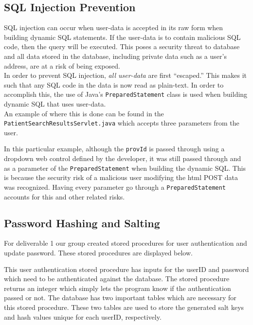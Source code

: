 \documentclass{article}
\begin{document}
\subsection{SQL Injection Prevention}
SQL injection can occur when user-data is accepted in its raw form when building dynamic SQL statements. If the user-data is to contain malicious SQL code, then the query will be executed. This poses a security threat to database and all data stored in the database, including private data such as a user's address, are at a risk of being exposed. \\

In order to prevent SQL injection, \textit{all user-data} are first ``escaped.'' This makes it such that any SQL code in the data is now read as plain-text. In order to accomplish this, the use of Java's \texttt{PreparedStatement} class is used when building dynamic SQL that uses user-data. \\

An example of where this is done can be found in the \texttt{PatientSearchResultsServlet.java} which accepts three parameters from the user.



In this particular example, although the \texttt{provId} is passed through using a dropdown web control defined by the developer, it was still passed through and as a parameter of the \texttt{PreparedStatement} when building the dynamic SQL. This is because the security risk of a malicious user modifying the html POST data was recognized. Having every parameter go through a \texttt{PreparedStatement} accounts for this and other related risks.

\subsection{Password Hashing and Salting}
For deliverable 1 our group created stored procedures for user authentication and update password. These stored procedures are displayed below.



This user authentication stored procedure has inputs for the userID and password which need to be authenticated against the database. The stored procedure returns an integer which simply lets the program know if the authentication passed or not. The database has two important tables which are necessary for this stored procedure. These two tables are used to store the generated salt keys and hash values unique for each userID, respectively. \\
\end{document}
